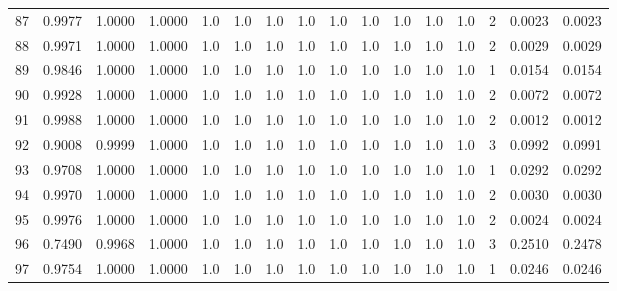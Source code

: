 \begin{tabular}{lrrrrrrrrrrrrrrr}
87  &      0.9977 &  1.0000 &  1.0000 &     1.0 &     1.0 &     1.0 &     1.0 &     1.0 &     1.0 &     1.0 &      1.0 &        1.0 &      2 &                    0.0023 &                     0.0023 \\
88  &      0.9971 &  1.0000 &  1.0000 &     1.0 &     1.0 &     1.0 &     1.0 &     1.0 &     1.0 &     1.0 &      1.0 &        1.0 &      2 &                    0.0029 &                     0.0029 \\
89  &      0.9846 &  1.0000 &  1.0000 &     1.0 &     1.0 &     1.0 &     1.0 &     1.0 &     1.0 &     1.0 &      1.0 &        1.0 &      1 &                    0.0154 &                     0.0154 \\
90  &      0.9928 &  1.0000 &  1.0000 &     1.0 &     1.0 &     1.0 &     1.0 &     1.0 &     1.0 &     1.0 &      1.0 &        1.0 &      2 &                    0.0072 &                     0.0072 \\
91  &      0.9988 &  1.0000 &  1.0000 &     1.0 &     1.0 &     1.0 &     1.0 &     1.0 &     1.0 &     1.0 &      1.0 &        1.0 &      2 &                    0.0012 &                     0.0012 \\
92  &      0.9008 &  0.9999 &  1.0000 &     1.0 &     1.0 &     1.0 &     1.0 &     1.0 &     1.0 &     1.0 &      1.0 &        1.0 &      3 &                    0.0992 &                     0.0991 \\
93  &      0.9708 &  1.0000 &  1.0000 &     1.0 &     1.0 &     1.0 &     1.0 &     1.0 &     1.0 &     1.0 &      1.0 &        1.0 &      1 &                    0.0292 &                     0.0292 \\
94  &      0.9970 &  1.0000 &  1.0000 &     1.0 &     1.0 &     1.0 &     1.0 &     1.0 &     1.0 &     1.0 &      1.0 &        1.0 &      2 &                    0.0030 &                     0.0030 \\
95  &      0.9976 &  1.0000 &  1.0000 &     1.0 &     1.0 &     1.0 &     1.0 &     1.0 &     1.0 &     1.0 &      1.0 &        1.0 &      2 &                    0.0024 &                     0.0024 \\
96  &      0.7490 &  0.9968 &  1.0000 &     1.0 &     1.0 &     1.0 &     1.0 &     1.0 &     1.0 &     1.0 &      1.0 &        1.0 &      3 &                    0.2510 &                     0.2478 \\
97  &      0.9754 &  1.0000 &  1.0000 &     1.0 &     1.0 &     1.0 &     1.0 &     1.0 &     1.0 &     1.0 &      1.0 &        1.0 &      1 &                    0.0246 &                     0.0246 \\

\end{tabular}
